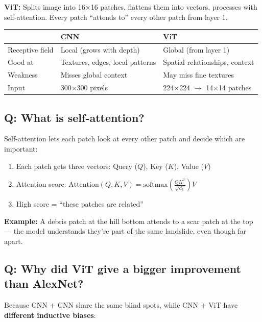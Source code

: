 \documentclass[11pt]{article}
\begin{document}
\textbf{ViT:} Splits image into 16$\times$16 patches, flattens them into vectors, processes with self-attention. Every patch ``attends to'' every other patch from layer 1.

\begin{table}[H]
    \centering
    \renewcommand{\arraystretch}{1.3}
    \begin{tabular}{lll}
        \toprule
        & \textbf{CNN} & \textbf{ViT} \\
        \midrule
        Receptive field & Local (grows with depth) & Global (from layer 1) \\
        Good at & Textures, edges, local patterns & Spatial relationships, context \\
        Weakness & Misses global context & May miss fine textures \\
        Input & 300$\times$300 pixels & 224$\times$224 $\to$ 14$\times$14 patches \\
        \bottomrule
    \end{tabular}
\end{table}

\subsection{Q: What is self-attention?}

Self-attention lets each patch look at every other patch and decide which are important:

\begin{enumerate}[noitemsep]
    \item Each patch gets three vectors: Query ($Q$), Key ($K$), Value ($V$)
    \item Attention score: $\text{Attention}(Q, K, V) = \text{softmax}\left(\frac{QK^T}{\sqrt{d_k}}\right) V$
    \item High score = ``these patches are related''
\end{enumerate}

\textbf{Example:} A debris patch at the hill bottom attends to a scar patch at the top --- the model understands they're part of the same landslide, even though far apart.

\subsection{Q: Why did ViT give a bigger improvement than AlexNet?}

Because CNN + CNN share the same blind spots, while CNN + ViT have \textbf{different inductive biases}:
\end{document}

